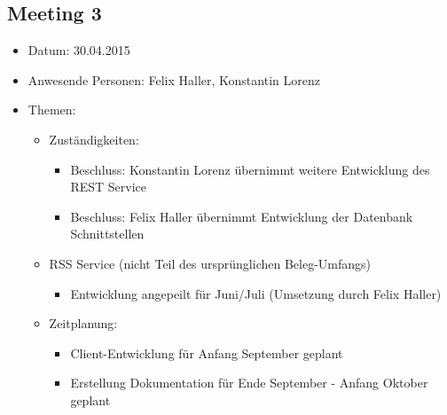 \documentclass[12pt]{scrartcl}
\begin{document}
		\subsection{Meeting 3}
		\begin{itemize}
			\item Datum: 30.04.2015
			\item Anwesende Personen: Felix Haller, Konstantin Lorenz
			\item Themen:
			\begin{itemize}
				\item Zuständigkeiten:
				\begin{itemize}
					\item Beschluss: Konstantin Lorenz übernimmt weitere Entwicklung des REST Service
					\item Beschluss: Felix Haller übernimmt Entwicklung der Datenbank Schnittstellen
				\end{itemize}
				\item RSS Service (nicht Teil des ursprünglichen Beleg-Umfangs)
				\begin{itemize}
					\item Entwicklung angepeilt für Juni/Juli (Umsetzung durch Felix Haller)
				\end{itemize}
				\item Zeitplanung:
				\begin{itemize}
					\item Client-Entwicklung für Anfang September geplant
					\item Erstellung Dokumentation für Ende September - Anfang Oktober geplant
				\end{itemize}
			\end{itemize}
		\end{itemize}
		
\end{document}

